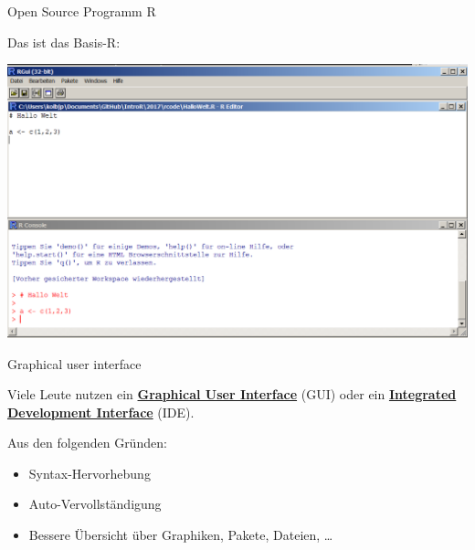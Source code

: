 \documentclass[ignorenonframetext,]{beamer}
\providecommand{\tightlist}{%
  \setlength{\itemsep}{0pt}\setlength{\parskip}{0pt}}
\begin{document}
\begin{frame}{Open Source Programm R}
\protect\hypertarget{open-source-programm-r}{}

\begin{block}{Das ist das Basis-R:}

\includegraphics{figure/BasisR.PNG}

\end{block}

\end{frame}

\begin{frame}{Graphical user interface}
\protect\hypertarget{graphical-user-interface}{}

Viele Leute nutzen ein
\href{https://en.wikipedia.org/wiki/Graphical_user_interface}{\textbf{Graphical
User Interface}} (GUI) oder ein
\href{https://en.wikipedia.org/wiki/Integrated_development_environment}{\textbf{Integrated
Development Interface}} (IDE).

Aus den folgenden Gründen:

\begin{itemize}
\tightlist
\item
  Syntax-Hervorhebung
\item
  Auto-Vervollständigung
\item
  Bessere Übersicht über Graphiken, Pakete, Dateien, \ldots{}
\end{itemize}

\end{frame}
\end{document}
